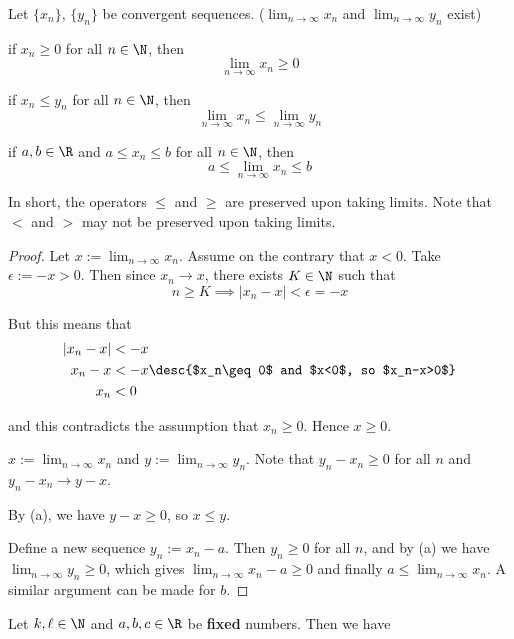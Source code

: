 \label{d88455d}

Let $\{x_n\}$, $\{y_n\}$ be convergent sequences.
($\displaystyle\lim_{n\to\infty}x_n$ and $\displaystyle\lim_{n\to\infty}y_n$
exist)
\begin{enumerata}
  \item if $x_n\geq0$ for all $n\in\N$, then
  $$
    \lim_{n\to\infty}x_n\geq0
  $$
  \item if $x_n\leq y_n$ for all $n\in\N$, then
  $$
    \lim_{n\to\infty}x_n\leq\lim_{n\to\infty}y_n
  $$
  \item if $a,b\in\R$ and $a\leq x_n\leq b$ for all $n\in\N$, then
  $$
    a\leq\lim_{n\to\infty}x_n\leq b
  $$
\end{enumerata}

In short, the operators $\leq$ and $\geq$ are preserved upon taking limits.
Note that $<$ and $>$ may not be preserved upon taking limits.

\begin{proof}
  \def\limn{\displaystyle\lim_{n\to\infty}}

   Let $x:=\limn x_n$. Assume on the contrary that $x<0$. Take
  $\epsilon:=-x>0$. Then since $x_n\to x$, there exists $K\in\N$ such that
  $$
    n\geq K\implies|x_n-x|<\epsilon=-x
  $$

  But this means that
  \begin{align*}
    |x_n-x| &<-x                                          \\
    x_n-x   &<-x\desc{$x_n\geq0$ and $x<0$, so $x_n-x>0$} \\
    x_n     &<0
  \end{align*}

  and this contradicts the assumption that $x_n\geq0$. Hence $x\geq0$.

   $x:=\limn x_n$ and $y:=\limn y_n$. Note that $y_n-x_n\geq0$ for
  all $n$ and \href{d13a5e7}{$y_n-x_n\to y-x$}.

  By (a), we have $y-x\geq0$, so $x\leq y$.

   Define a new sequence $y_n:=x_n-a$. Then $y_n\geq0$ for all $n$,
  and by (a) we have $\limn y_n\geq0$, which gives $\limn x_n-a\geq0$ and
  finally $a\leq\limn x_n$. A similar argument can be made for $b$.
\end{proof}

\label{d44aef3}

Let $k,\ell\in\N$ and $a,b,c\in\R$ be \textbf{fixed} numbers. Then we have

